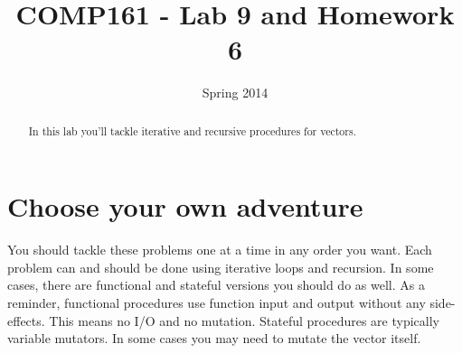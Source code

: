 \documentclass[]{tufte-handout}
\title{COMP161 - Lab 9 and Homework 6}
\author{}
\date{Spring 2014}
\begin{document}
\maketitle

\begin{abstract}
In this lab you'll tackle iterative and recursive procedures for vectors.
\end{abstract}

\section{Choose your own adventure}

You should tackle these problems one at a time in any order you want.  Each problem can and should be done using iterative loops and recursion. In some cases, there are functional and stateful versions you should do as well.  As a reminder, functional procedures use function input and output without any side-effects. This means no I/O and no mutation. Stateful procedures are typically variable mutators.  In some cases you may need to mutate the vector itself.
\end{document}
